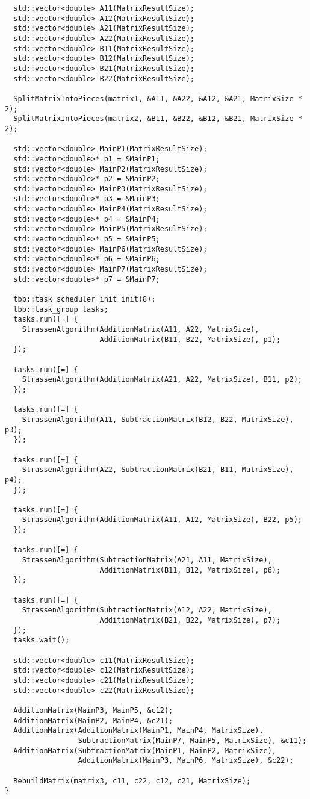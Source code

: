 \documentclass{report}
\begin{document}
\begin{lstlisting}
  std::vector<double> A11(MatrixResultSize);
  std::vector<double> A12(MatrixResultSize);
  std::vector<double> A21(MatrixResultSize);
  std::vector<double> A22(MatrixResultSize);
  std::vector<double> B11(MatrixResultSize);
  std::vector<double> B12(MatrixResultSize);
  std::vector<double> B21(MatrixResultSize);
  std::vector<double> B22(MatrixResultSize);

  SplitMatrixIntoPieces(matrix1, &A11, &A22, &A12, &A21, MatrixSize * 2);
  SplitMatrixIntoPieces(matrix2, &B11, &B22, &B12, &B21, MatrixSize * 2);

  std::vector<double> MainP1(MatrixResultSize);
  std::vector<double>* p1 = &MainP1;
  std::vector<double> MainP2(MatrixResultSize);
  std::vector<double>* p2 = &MainP2;
  std::vector<double> MainP3(MatrixResultSize);
  std::vector<double>* p3 = &MainP3;
  std::vector<double> MainP4(MatrixResultSize);
  std::vector<double>* p4 = &MainP4;
  std::vector<double> MainP5(MatrixResultSize);
  std::vector<double>* p5 = &MainP5;
  std::vector<double> MainP6(MatrixResultSize);
  std::vector<double>* p6 = &MainP6;
  std::vector<double> MainP7(MatrixResultSize);
  std::vector<double>* p7 = &MainP7;

  tbb::task_scheduler_init init(8);
  tbb::task_group tasks;
  tasks.run([=] {
    StrassenAlgorithm(AdditionMatrix(A11, A22, MatrixSize),
                      AdditionMatrix(B11, B22, MatrixSize), p1);
  });

  tasks.run([=] {
    StrassenAlgorithm(AdditionMatrix(A21, A22, MatrixSize), B11, p2);
  });

  tasks.run([=] {
    StrassenAlgorithm(A11, SubtractionMatrix(B12, B22, MatrixSize), p3);
  });

  tasks.run([=] {
    StrassenAlgorithm(A22, SubtractionMatrix(B21, B11, MatrixSize), p4);
  });

  tasks.run([=] {
    StrassenAlgorithm(AdditionMatrix(A11, A12, MatrixSize), B22, p5);
  });

  tasks.run([=] {
    StrassenAlgorithm(SubtractionMatrix(A21, A11, MatrixSize),
                      AdditionMatrix(B11, B12, MatrixSize), p6);
  });

  tasks.run([=] {
    StrassenAlgorithm(SubtractionMatrix(A12, A22, MatrixSize),
                      AdditionMatrix(B21, B22, MatrixSize), p7);
  });
  tasks.wait();

  std::vector<double> c11(MatrixResultSize);
  std::vector<double> c12(MatrixResultSize);
  std::vector<double> c21(MatrixResultSize);
  std::vector<double> c22(MatrixResultSize);

  AdditionMatrix(MainP3, MainP5, &c12);
  AdditionMatrix(MainP2, MainP4, &c21);
  AdditionMatrix(AdditionMatrix(MainP1, MainP4, MatrixSize),
                 SubtractionMatrix(MainP7, MainP5, MatrixSize), &c11);
  AdditionMatrix(SubtractionMatrix(MainP1, MainP2, MatrixSize),
                 AdditionMatrix(MainP3, MainP6, MatrixSize), &c22);

  RebuildMatrix(matrix3, c11, c22, c12, c21, MatrixSize);
}

\end{lstlisting}
    
\end{document}
